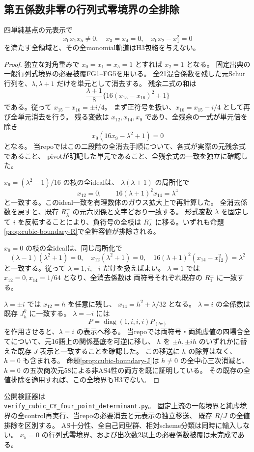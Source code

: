 \subsection{第五係数非零の行列式零境界の全排除}
\label{subsec:cubic-CY-four-point-determinant}
\begin{theorem}\label{thm:cubic-CY-four-point-determinant-empty}
四単純基点の元表示で
\[
 x_0x_1x_5\ne0,\quad x_3=x_4=0,\quad x_0x_2-x_1^2=0
\]
を満たす全領域と、その全monomial軌道はH3包絡を与えない。
\end{theorem}
\begin{proof}
独立な対角重みで $x_0=x_1=x_5=1$ とすれば $x_2=1$ となる。
固定出典\cite{AS4CYpinned}の一般行列式境界の必要被覆FG1--FG5を用いる。
全21混合係数を残した元Schur行列を、$\lambda,\lambda+1$ だけを単元として消去する。
残余二式の和は
\[
 \frac{\lambda+1}{8}\{16(x_{15}-x_{16})^2+1\}
\]
である。従って $x_{15}-x_{16}=\pm i/4$。
まず正符号を扱い、$x_{16}=x_{15}-i/4$ として再び全単元消去を行う。
残る変数は $x_{12},x_{14},x_9$ であり、全残余の一式が単元倍を除き
\[
 x_9(16x_9-\lambda^2+1)=0
\]
となる。
当repoではこの二段階の全消去手順について、各式が実際の元残余式であること、
pivotが明記した単元であること、全残余式の一致を独立に確認した。

$x_9=(\lambda^2-1)/16$ の枝の全idealは、
$\lambda(\lambda+1)$ の局所化で
\[
 x_{12}=0,\qquad16(\lambda+1)^2x_{14}=\lambda^4
\]
と一致する。このideal一致を有理数体のガウス拡大上で再計算した。
全消去係数を戻すと、既存 $R^+_\lambda$ の元六関係と文字どおり一致する。
形式変数 $\lambda$ を固定して $i$ を反転することにより、負符号の全枝は
$R^-_\lambda$ に移る。いずれも命題\ref{prop:cubic-boundary-R}で全許容値が排除される。

$x_9=0$ の枝の全idealは、同じ局所化で
\[
 (\lambda-1)(\lambda^2+1)=0,\quad x_{12}(\lambda^2+1)=0,\quad
 16(\lambda+1)^2(x_{14}-x_{12}^2)=\lambda^2
\]
と一致する。従って $\lambda=1,i,-i$ だけを扱えばよい。
$\lambda=1$ では $x_{12}=0,x_{14}=1/64$ となり、全消去係数は
両符号それぞれ既存の $R^\pm_1$ に一致する。

$\lambda=\pm i$ では $x_{12}=h$ を任意に残し、
$x_{14}=h^2+\lambda/32$ となる。
$\lambda=i$ の全係数は既存 $J^\eta_h$ に一致する。
$\lambda=-i$ には
\[
 P=\operatorname{diag}(1,i,i,i)P_{(bc)}
\]
を作用させると、$\lambda=i$ の表示へ移る。
当repoでは両符号・両純虚値の四場合全てについて、元16語上の関係基底を可逆に移し、
$h$ を $\pm h,\pm ih$ のいずれかに替えた既存 $J$ 表示と一致することを確認した。
この移送に $h$ の除算はなく、$h=0$ も含まれる。
命題\ref{prop:cubic-boundary-J}は $h\ne0$ の全中心三次消滅と、
$h=0$ の五次商次元58による非AS4性の両方を既に証明している。
その既存の全値排除を適用すれば、この全境界もH3でない。
\end{proof}

公開検証器は\\
\texttt{verify\_cubic\_CY\_four\_point\_determinant.py}。
固定上流の一般境界と純虚境界の全control再実行、当repoの必要消去と元表示の独立移送、
既存 $R/J$ の全値排除を区別する。
AS十分性、全自己同型群、相対scheme分類は同時に輸入しない。
$x_5=0$ の行列式零境界、および出次数2以上の必要係数被覆は未完成である。

